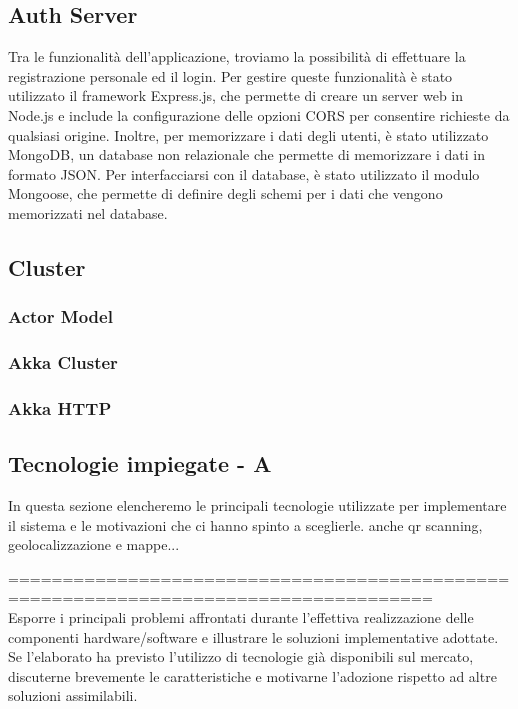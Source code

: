\subsection{Auth Server}


Tra le funzionalità dell'applicazione, troviamo la possibilità di effettuare la
registrazione personale ed il login. Per gestire queste funzionalità è stato utilizzato
il framework Express.js, che permette di creare un server web in Node.js e include
la configurazione delle opzioni CORS per consentire richieste da qualsiasi origine.
Inoltre, per memorizzare i dati degli utenti, è stato utilizzato MongoDB,
un database non relazionale che permette di memorizzare i dati in formato JSON.
Per interfacciarsi con il database, è stato utilizzato il modulo Mongoose, che
permette di definire degli schemi per i dati che vengono memorizzati nel database.



\subsection{Cluster}
\subsubsection{Actor Model}
\subsubsection{Akka Cluster}
\subsubsection{Akka HTTP}

\subsection{Tecnologie impiegate - A}
In questa sezione elencheremo le principali tecnologie utilizzate per implementare il sistema e le motivazioni che ci hanno spinto a sceglierle.
anche qr scanning, geolocalizzazione e mappe...

===================================================================================== \\
Esporre i principali problemi affrontati durante l'effettiva realizzazione delle componenti hardware/software e illustrare le soluzioni implementative adottate. Se l'elaborato ha previsto l'utilizzo di tecnologie già disponibili sul mercato, discuterne brevemente le caratteristiche e motivarne l'adozione rispetto ad altre soluzioni assimilabili.\\

